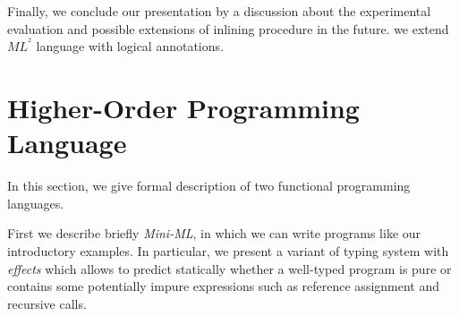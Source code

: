 \documentclass[a4paper,11pt,oneside]{article}
\theoremstyle{plain}
\newcommand{\inlsrc}{\textit{ML}^{^2}}
\begin{document}
 Finally, we conclude our presentation by a discussion about the experimental evaluation and possible extensions of inlining procedure in the future.
we extend $\inlsrc$ language with logical annotations.  
 
 
%






%
%
% 

%
%
%
%



\newpage
\section{Higher-Order Programming Language }

	In this section, we give formal description of two functional programming languages. 
	
	First we describe briefly \textit{Mini-ML}, in which we can write programs like our introductory examples.
	In particular, we present a variant of typing system with \textit{effects} which allows to predict statically whether a well-typed program is pure or contains some potentially impure expressions such as reference assignment and recursive calls.  
	
\end{document}
